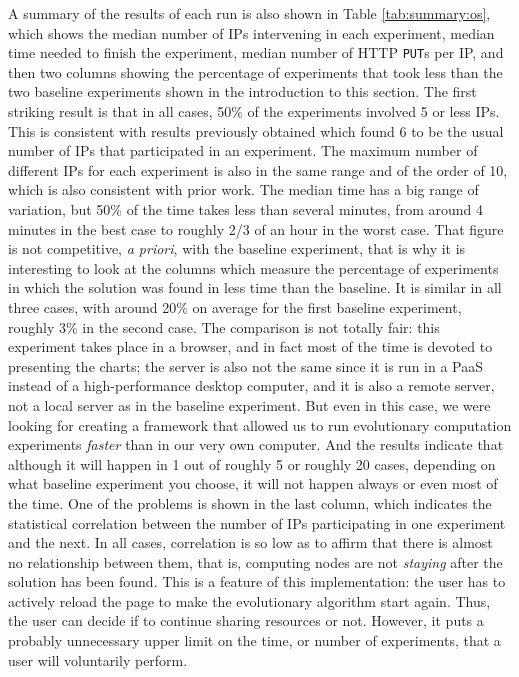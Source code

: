 \documentclass[journal,onecolumn]{IEEEtran}
\begin{document}
A summary of the results of each run is also shown in Table
\ref{tab:summary:os}, which shows the median number of IPs
intervening in each experiment,  median time needed
to finish the experiment, median number of HTTP {\tt PUT}s per IP, and
then two columns showing the percentage of experiments that took less
than the two baseline experiments shown in the introduction to this
section. The first striking result is that in all cases, 50\% of the
experiments involved 5 or less IPs. This is consistent with results
previously obtained \cite{DBLP:conf/gecco/GuervosG15} which found 6 to be
the usual number of IPs that participated in an experiment. The
maximum number of different IPs for each experiment is also in the
same range and of the order of 10, which is also consistent with
prior work. The median time has a big range of variation, but 50\% of
the time takes less than several minutes, from around 4 minutes in the
best case to roughly 2/3 of an hour in the worst case. That figure is
not competitive, {\em a priori}, with the baseline experiment, that is
why it is interesting to look at the columns which measure
the percentage of experiments in which the solution was found in less
time than the baseline. It is similar in all three cases, with around
20\% on average for the first baseline experiment, roughly 3\% in the
second case. The comparison is not totally fair: this experiment takes
place in a browser, and in fact most of the time is devoted to
presenting the charts; the server is also not the same since it is run in a
PaaS instead of a high-performance desktop computer, and it is also a
remote server, not a local server as in the baseline experiment. But
even in this case, we were looking for creating a framework that
allowed us to run evolutionary computation experiments {\em faster} than
in our very own computer. And the results indicate that although it will
happen in 1 out of roughly 5 or roughly 20 cases, depending on what baseline
experiment you choose, it will not happen always or even most of
the time. One of the problems is shown in the last column, which
indicates the statistical correlation between the number of IPs
participating in one experiment and the next. In all cases,
correlation is so low as to affirm that there is almost no
relationship between them, that is, computing nodes are not {\em
  staying} after the solution has been found. This is a feature of
this implementation: the user has to actively reload the page to make
the evolutionary algorithm start again. Thus, the user can decide if to 
continue sharing resources or not. %
However, it puts a probably            %
unnecessary upper limit on the time, or number of experiments, that a user
will voluntarily perform.
\end{document}
